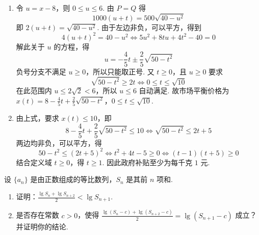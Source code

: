 \begin{solution}
\begin{enumerate}
\item 令 \(u=x-8\)，则 \(0\leqslant u\leqslant6\). 由 \(P=Q\) 得
\[
1000(u+t)=500\sqrt{40-u^2}
\]
即 \(2(u+t)=\sqrt{40-u^2}\). 由于左边非负，可以平方，得到
\[
4(u+t)^2=40-u^2
\Longleftrightarrow 5u^2+8tu+4t^2-40=0
\]
解此关于 \(u\) 的方程，得
\[
u=-\frac45t\pm\frac25\sqrt{50-t^2}
\]
负号分支不满足 \(u\geqslant0\)，所以只能取正号. 又 \(t\geqslant0\)，且 \(u\geqslant0\) 要求
\[
\sqrt{50-t^2}\geqslant2t\Longleftrightarrow 0\leqslant t\leqslant\sqrt{10}
\]
在此范围内 \(u\leqslant2\sqrt2<6\)，所以 \(u\leqslant6\) 自动满足. 故市场平衡价格为
\(x(t)=8-\frac45t+\frac25\sqrt{50-t^2}\)，\(0\leqslant t\leqslant\sqrt{10}\).

\item 由上式，要求 \(x(t)\leqslant10\)，即
\[
8-\frac45t+\frac25\sqrt{50-t^2}\leqslant10
\Longleftrightarrow \sqrt{50-t^2}\leqslant2t+5
\]
两边均非负，可以平方，得
\[
50-t^2\leqslant(2t+5)^2
\Longleftrightarrow t^2+4t-5\geqslant0
\Longleftrightarrow (t-1)(t+5)\geqslant0
\]
结合定义域 \(t\geqslant0\)，得 \(t\geqslant1\). 因此政府补贴至少为每千克 \(1\) 元.
\end{enumerate}
\end{solution}

\begin{problem}
设 \(\{a_{n}\}\) 是由正数组成的等比数列，\(S_{n}\) 是其前 \(n\) 项和.

\begin{enumerate}
\item 证明：\(\frac{\lg S_n + \lg S_{n + 2}}{2} < \lg S_{n + 1}\).

\item 是否存在常数 \(c > 0\)，使得 \(\frac{\lg (S_n - c) + \lg (S_{n+2} - c)}{2} = \lg (S_{n+1} - c)\) 成立？并证明你的结论.
\end{enumerate}
\end{problem}

